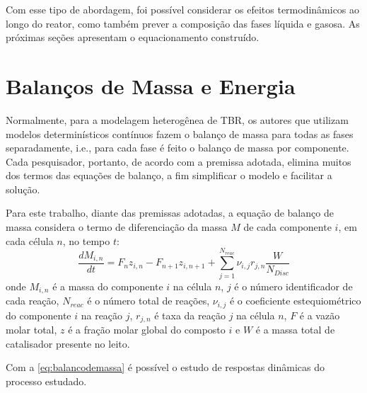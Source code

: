 Com esse tipo de abordagem, foi possível considerar os efeitos termodinâmicos
ao longo do reator, como também prever a composição das fases líquida e
gasosa. As próximas seções apresentam o equacionamento construído.

\section{Balanços de Massa e Energia} \label{sec:balancomassaenergia}

Normalmente, para a modelagem heterogênea de TBR, os autores que
utilizam modelos determinísticos contínuos fazem o balanço de massa para todas as
fases separadamente, i.e., para cada fase é feito o balanço de massa por
componente. %
Cada pesquisador, portanto, de acordo com a premissa adotada, elimina muitos dos
termos das equações de balanço, a fim simplificar o modelo e facilitar a
solução. 

Para este trabalho, diante das premissas adotadas, a equação de balanço de massa
considera o termo de diferenciação da massa $M$ de cada componente $i$, em cada
célula $n$, no tempo $t$: 
\begin{equation}
\dfrac{dM_{i,n}}{dt} = F_n z_{i,n} - F_{n+1} z_{i,n+1} +
\displaystyle\sum_{j=1}^{N_{reac}} \nu_{i,j}r_{j,n} \dfrac{W}{N_{Disc}}
\label{eq:balancodemassa}
\end{equation}
onde $M_{i,n}$ é a massa do componente $i$ na célula $n$, $j$ é o número
identificador de cada reação, $N_{reac}$ é o número total de reações,
$\nu_{i,j}$ é o coeficiente estequiométrico do componente $i$ na reação $j$,
$r_{j,n}$ é taxa da reação $j$ na célula $n$, $F$ é a vazão molar total,
$z$ é a fração molar global do composto $i$ e $W$ é a massa total de
catalisador presente no leito.

Com a \autoref{eq:balancodemassa} é possível o estudo de respostas dinâmicas do
processo estudado.


